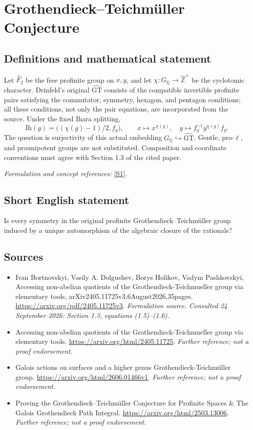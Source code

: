 \documentclass[11pt]{article}
\begin{document}
\section*{\texorpdfstring{Grothendieck–Teichmüller Conjecture}{Grothendieck–Teichmüller Conjecture}}\label{91}
\subsection{Definitions and mathematical statement}
Let $\widehat F_2$ be the free profinite group on $x,y$, and let $\chi:G_{{\mathbb{Q}}}\to\widehat{{\mathbb{Z}}}^\times$ be the cyclotomic character. Drinfeld's original $\widehat{\mathrm{GT}}$ consists of the compatible invertible profinite pairs satisfying the commutator, symmetry, hexagon, and pentagon conditions; all these conditions, not only the pair equations, are incorporated from the source. Under the fixed Ihara splitting,
\[
 \mathrm{Ih}(g)=\bigl((\chi(g)-1)/2,f_g\bigr),\qquad
 x\mapsto x^{\chi(g)},\quad y\mapsto f_g^{-1}y^{\chi(g)}f_g.
\]
The question is surjectivity of this actual embedding $G_{{\mathbb{Q}}}\hookrightarrow\widehat{\mathrm{GT}}$. Gentle, pro-$\ell$, and prounipotent groups are not substituted. Composition and coordinate conventions must agree with Section 1.3 of the cited paper.
\par\smallskip\textit{Formulation and concept references:} \href{https://arxiv.org/pdf/2405.11725v3}{[S1]}.

\subsection{Short English statement}
Is every symmetry in the original profinite Grothendieck--Teichmüller group induced by a unique automorphism of the algebraic closure of the rationals?
\subsection{Sources}
\begin{itemize}
\item[S1]Ivan Bortnovskyi, Vasily A. Dolgushev, Borys Holikov, Vadym Pashkovskyi, Accessing non-abelian quotients of the Grothendieck-Teichmueller group via elementary tools, arXiv2405.11725v3,6August2026,35pages.
\url{https://arxiv.org/pdf/2405.11725v3}.
\textit{Formulation source. Consulted 24 September 2026: Section 1.3, equations (1.5)--(1.6).}
\item[S2]Accessing non-abelian quotients of the Grothendieck-Teichmueller group via elementary tools.
\url{https://arxiv.org/html/2405.11725}.
\textit{Further reference; not a proof endorsement.}
\item[S3]Galois actions on surfaces and a higher genus Grothendieck-Teichmüller group.
\url{https://arxiv.org/html/2606.01466v1}.
\textit{Further reference; not a proof endorsement.}
\item[S4]Proving the Grothendieck–Teichmüller Conjecture for Profinite Spaces \& The Galois Grothendieck Path Integral.
\url{https://arxiv.org/html/2503.13006}.
\textit{Further reference; not a proof endorsement.}
\end{itemize}
\end{document}
